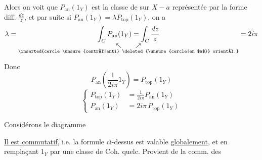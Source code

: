 
Alors on voit que $P_{\mathrm{an}}(1_Y)$ est la classe de  sur $X-a$ représentée par la forme diff. $\frac{dz}{z}$, et par suite  si $P_{\mathrm{an}}(1_Y)=\lambda P_{\mathrm{top}}(1_Y)$, on a
\[
\lambda=\underset{\substack{\nwarrow\qquad\nearrow\\\text{\inserted{cercle \unsure{centré|anti} \deleted{\unsure{cercle|en $a$}} orienté.}}}}{\int_C P_{\mathrm{an}}(1_Y)=\int_C\frac{dz}{z}}=2i\pi
\]

Donc
\[
\boxed{P_{\mathrm{an}}\left(\frac{1}{2i\pi}1_Y\right)=P_{\mathrm{top}}(1_Y)}
\]
\[
\boxed{\left\{\begin{aligned}
P_{\mathrm{top}}(1_Y)&=\frac{1}{2i\pi}P_{\mathrm{an}}(1_Y)\\
P_{\mathrm{an}}(1_Y)&=2i\pi\,P_{\mathrm{top}}(1_Y)
\end{aligned}\right.}
\]

\uline{} Considérons le diagramme

\uline{Il est commutatif}, i.e. la formule ci-dessus est valable \uline{globalement}, et en remplaçant $1_Y$ par une classe de Coh. quelc. Provient de la comm. des
